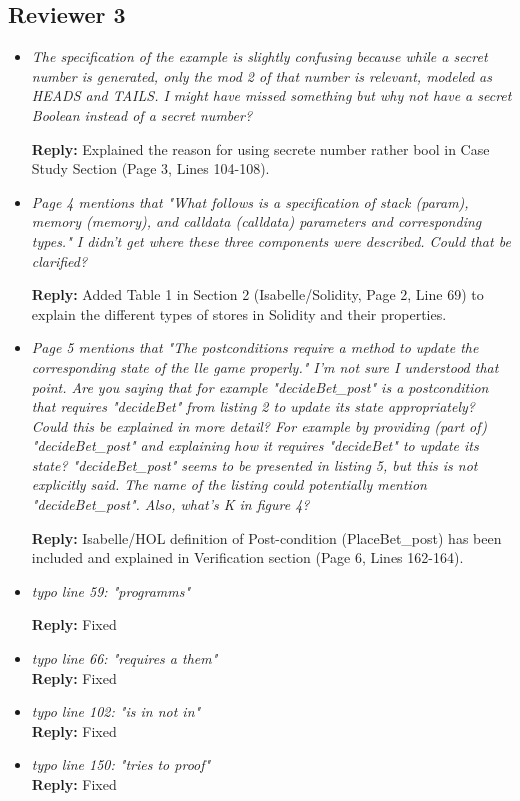 \documentclass[a4paper, 12pt] {article}
\begin{document}
\subsection{Reviewer 3}
\begin{itemize}
	\item \emph{The specification of the example is slightly confusing because while a secret number is generated, only the mod 2 of that number is relevant, modeled as HEADS and TAILS. I might have missed something but why not have a secret Boolean instead of a secret number?  }
	
	
	\textbf{Reply:} Explained the reason for using secrete number rather bool in Case Study Section (Page 3, Lines 104-108).
	
	\item \emph{Page 4 mentions that "What follows is a specification of stack (param), memory (memory), and calldata (calldata) parameters and corresponding types." I didn't get where these three components were described. Could that be clarified?  }
	
	
	\textbf{Reply:} Added Table 1 in Section 2 (Isabelle/Solidity, Page 2, Line 69) to explain the different types of stores in Solidity and their properties.
	
  \item \emph{Page 5 mentions that "The postconditions require a method to update the corresponding state of the lle game properly." I'm not sure I understood that point. Are you saying that for example "decideBet\_post" is a postcondition that requires "decideBet" from listing 2 to update its state appropriately? Could this be explained in more detail? For example by providing (part of) "decideBet\_post" and explaining how it requires "decideBet" to update its state? "decideBet\_post" seems to be presented in listing 5, but this is not explicitly said. The name of the listing could potentially mention "decideBet\_post". Also, what's K in figure 4? }


\textbf{Reply:} Isabelle/HOL definition of Post-condition (PlaceBet\_post) has been included and explained in Verification section (Page 6, Lines 162-164).


\item \emph{ typo line 59: "programms"
}

\textbf{Reply:}  Fixed

\item \emph{ typo line 66: "requires a them" }\\
\textbf{Reply:}  Fixed
 
 \item \emph{typo line 102: "is in not in"  }\\
\textbf{Reply:}  Fixed
 
  \item \emph{typo line 150: "tries to proof"  }\\
\textbf{Reply:}  Fixed
\end{itemize}


%
%


\end{document}
